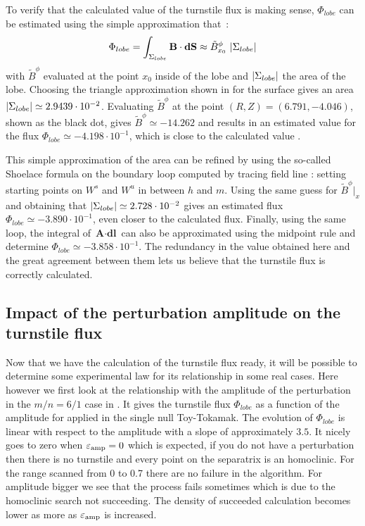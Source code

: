 To verify that the calculated value of the turnstile flux is making sense, $\Phi_{lobe}$ can be estimated using the simple approximation that~:
\begin{equation}
     \Phi_{lobe} = \int_{\Sigma_{lobe}} \textbf{B}\cdot\textbf{dS} \approx \tilde{B}^\phi_{x_0}\,\,\vert\Sigma_{lobe}\vert
\end{equation}
with $\tilde{B}^\phi$ evaluated at the point $x_0$ inside of the lobe and $\vert\Sigma_{lobe}\vert$ the area of the lobe. Choosing the triangle approximation shown in  for the surface gives an area $\vert\Sigma_{lobe}\vert \simeq 2.9439\cdot 10^{-2}$. Evaluating $\tilde{B}^\phi$ at the point $(R, Z) = (6.791, -4.046)$, shown as the black dot, gives $\tilde{B}^\phi \simeq -14.262$ and results in an estimated value for the flux $\Phi_{lobe} \simeq -4.198\cdot 10^{-1}$, which is close to the calculated value .

This simple approximation of the area can be refined by using the so-called Shoelace formula on the boundary loop  computed by tracing field line : setting starting points on $W^s$ and $W^u$ in between $h$ and $m$. Using the same guess for $\tilde{B}^\phi\vert_x$ and obtaining that $\vert\Sigma_{lobe}\vert \simeq 2.728\cdot 10^{-2}$ gives an estimated flux $\Phi_{lobe} \simeq  -3.890\cdot 10^{-1}$, even closer to the calculated flux. Finally, using the same loop, the integral of $\textbf{A}\cdot\textbf{dl}$ can also be approximated using the midpoint rule and determine $\Phi_{lobe} \simeq  -3.858\cdot 10^{-1}$. The redundancy in the value obtained here and the great agreement between them lets us believe that the turnstile flux is correctly calculated.

\subsection{Impact of the perturbation amplitude on the turnstile flux}
\newcommand{\tf}{\Phi_{lobe}}

Now that we have the calculation of the turnstile flux ready, it will be possible to determine some experimental law for its relationship in some real cases. Here however we first look at the relationship with the amplitude of the perturbation in the $m/n=6/1$ case in . It gives the turnstile flux $\tf$ as a function of the amplitude for applied in the single null Toy-Tokamak. The evolution of $\tf$ is linear with respect to the amplitude with a slope of approximately $3.5$. It nicely goes to zero when $\varepsilon_\text{amp} = 0$ which is expected, if you do not have a perturbation then there is no turnstile and every point on the separatrix is an homoclinic. For the range scanned from 0 to 0.7 there are no failure in the algorithm. For amplitude bigger we see that the process fails sometimes which is due to the homoclinic search not succeeding. The density of succeeded calculation becomes lower as more as $\varepsilon_\text{amp}$ is increased.

